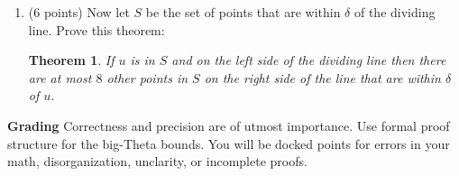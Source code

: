 \documentclass[paper=a4, fontsize=11pt]{scrartcl}
\newtheorem{theorem}{Theorem}
\numberwithin{equation}{section}		%
\numberwithin{figure}{section}			%
\numberwithin{table}{section}				%
\begin{document}
\begin{enumerate}
\item (6 points)  Now let $S$ be the set of points that are within $\delta$ of the dividing line.  Prove this theorem:
\begin{theorem}
If $u$ is in $S$ and on the left side of the dividing line then there are at most $8$ other points in $S$ on the right side of the line that are within $\delta$ of $u$.
\end{theorem}
\end{enumerate}


\noindent\textbf{Grading} Correctness and precision are of utmost importance.  Use formal proof structure for the big-Theta bounds.  You will be docked points for errors in your math, disorganization, unclarity, or incomplete proofs.    
\end{document}
